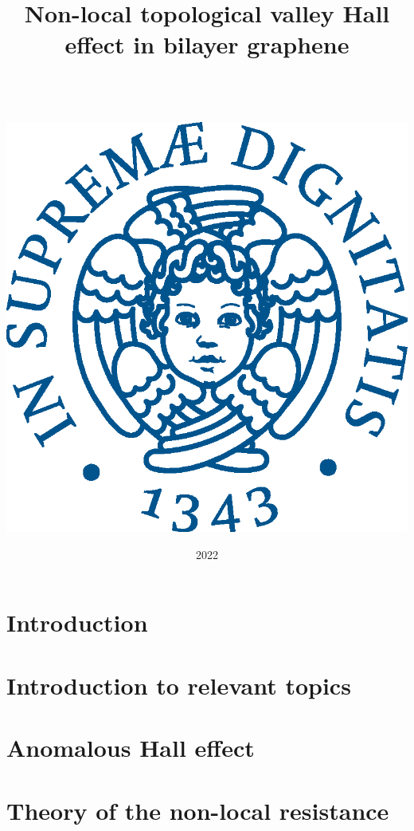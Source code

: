 \documentclass[11pt,a4paper]{report}
\date{{\LARGE 2022}}
\title{{\myfont Non-local topological valley Hall effect in bilayer graphene}}
\author{{\Huge }\\ \\ \\
		\includegraphics[scale=0.6]{Immagini/cherubino.eps}\\}
\theoremstyle{definition}
\theoremstyle{plain}
\theoremstyle{plain}
\begin{document}
	\maketitle
	\tableofcontents
	\chapter*{Introduction}
	
	
	\chapter{Introduction to relevant topics}
	
	
	
	
	
	

	\chapter{Anomalous Hall effect}
	
	
	
	

	\chapter{Theory of the non-local resistance}
	
	
	

	
	
	
	\printbibliography
\end{document}
